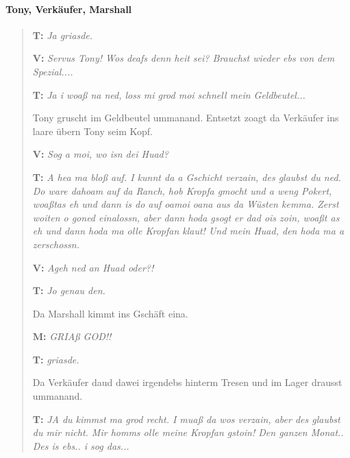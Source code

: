 \documentclass[script_part_two.tex]{subfiles}
\begin{document}
\paragraph{Tony, Verkäufer, Marshall}
\begin{verse}
\textbf{T:} \textit{\glqq Ja griasde.\grqq}

\textbf{V:} \textit{\glqq Servus Tony! Wos deafs denn heit sei? Brauchst wieder ebs von dem Spezial....\grqq}

\textbf{T:} \textit{\glqq Ja i woaß na ned, loss mi grod moi schnell mein Geldbeutel...\grqq}

Tony gruscht im Geldbeutel ummanand. Entsetzt zoagt da Verkäufer ins laare übern Tony seim Kopf.

\textbf{V:} \textit{\glqq Sog a moi, wo isn dei Huad?\grqq}

\textbf{T:} \textit{\glqq A hea ma bloß auf. I kunnt da a Gschicht verzain, des glaubst du ned. Do ware dahoam auf da Ranch, hob Kropfa gmocht und a weng Pokert, woaßtas eh und dann is do auf oamoi oana aus da Wüsten kemma. Zerst woiten o goned einalossn, aber dann hoda gsogt er dad ois zoin, woaßt as eh und dann hoda ma olle Kropfan klaut! Und mein Huad, den hoda ma a zerschossn.\grqq}

\textbf{V:} \textit{\glqq Ageh ned an Huad oder?!\grqq}

\textbf{T:} \textit{\glqq Jo genau den.\grqq}

Da Marshall kimmt ins Gschäft eina.


\textbf{M:} \textit{\glqq GRIAß GOD!!\grqq}

\textbf{T:} \textit{\glqq griasde.\grqq}

Da Verkäufer daud dawei irgendebs hinterm Tresen und im Lager drausst ummanand.

\textbf{T:} \textit{\glqq JA du kimmst ma grod recht. I muaß da wos verzain, aber des glaubst du mir nicht. Mir homms olle meine Kropfan gstoin! Den ganzen Monat.. Des is ebs.. i sog das...\grqq}

\end{verse}
\end{document}
